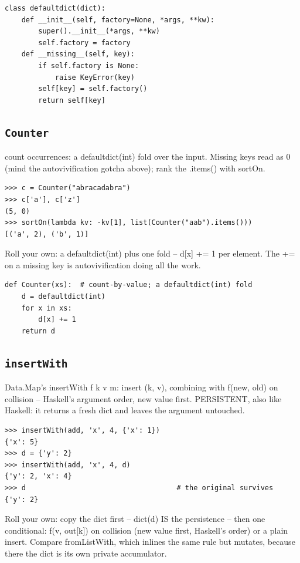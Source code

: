 \documentclass[10pt,letterpaper]{book}
\begin{document}
\begin{lstlisting}[style=ex]
class defaultdict(dict):
    def __init__(self, factory=None, *args, **kw):
        super().__init__(*args, **kw)
        self.factory = factory
    def __missing__(self, key):
        if self.factory is None:
            raise KeyError(key)
        self[key] = self.factory()
        return self[key]
\end{lstlisting}
\subsection{\texttt{Counter}}\label{def:Counter}
count occurrences: a defaultdict(int) fold over the input. Missing keys read as 0 (mind the autovivification gotcha above); rank the .items() with sortOn.
\begin{lstlisting}[style=ex]
>>> c = Counter("abracadabra")
>>> c['a'], c['z']
(5, 0)
>>> sortOn(lambda kv: -kv[1], list(Counter("aab").items()))
[('a', 2), ('b', 1)]
\end{lstlisting}

Roll your own: a defaultdict(int) plus one fold -- d[x] += 1 per element. The += on a missing key is autovivification doing all the work.

\begin{lstlisting}[style=ex]
def Counter(xs):  # count-by-value; a defaultdict(int) fold
    d = defaultdict(int)
    for x in xs:
        d[x] += 1
    return d
\end{lstlisting}
\subsection{\texttt{insertWith}}\label{def:insertWith}
Data.Map's insertWith f k v m: insert (k, v), combining with f(new, old) on collision -- Haskell's argument order, new value first. PERSISTENT, also like Haskell: it returns a fresh dict and leaves the argument untouched.
\begin{lstlisting}[style=ex]
>>> insertWith(add, 'x', 4, {'x': 1})
{'x': 5}
>>> d = {'y': 2}
>>> insertWith(add, 'x', 4, d)
{'y': 2, 'x': 4}
>>> d                                    # the original survives
{'y': 2}
\end{lstlisting}

Roll your own: copy the dict first -- dict(d) IS the persistence -- then one conditional: f(v, out[k]) on collision (new value first, Haskell's order) or a plain insert. Compare fromListWith, which inlines the same rule but mutates, because there the dict is its own private accumulator.
\end{document}
